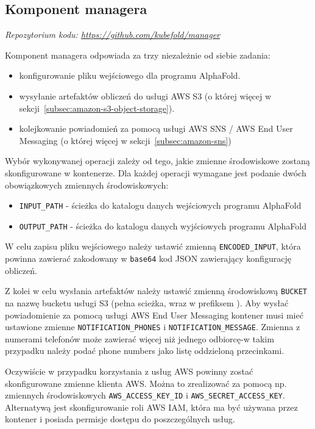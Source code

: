 \subsection{Komponent managera}\label{subsec:component-manager}
\textit{Repozytorium kodu: \url{https://github.com/kubefold/manager}}

Komponent managera odpowiada za trzy niezależnie od siebie zadania:
\begin{itemize}
    \item konfigurowanie pliku wejściowego  dla programu AlphaFold.
    \item wysyłanie artefaktów obliczeń do usługi AWS S3 (o której więcej w sekcji~\ref{subsec:amazon-s3-object-storage}).
    \item kolejkowanie powiadomień za pomocą usługi AWS SNS / AWS End User Messaging (o której więcej w sekcji~\ref{subsec:amazon-sns})
\end{itemize}

Wybór wykonywanej operacji zależy od tego, jakie zmienne środowiskowe zostaną skonfigurowane w kontenerze.
Dla każdej operacji wymagane jest podanie dwóch obowiązkowych zmiennych środowiskowych:
\begin{itemize}
    \item \texttt{INPUT\_PATH} - ścieżka do katalogu danych wejściowych programu AlphaFold
    \item \texttt{OUTPUT\_PATH} - ścieżka do katalogu danych wyjściowych programu AlphaFold
\end{itemize}

W celu zapisu pliku wejściowego  należy ustawić zmienną \texttt{ENCODED\_INPUT}, która powinna zawierać zakodowany w \texttt{base64} kod JSON zawierający konfigurację obliczeń.

Z kolei w celu wysłania artefaktów należy ustawić zmienną środowiskową \texttt{BUCKET} na nazwę bucketu usługi S3 (pełna scieżka, wraz w prefiksem ).
Aby wysłać powiadomienie za pomocą usługi AWS End User Messaging kontener musi mieć ustawione zmienne \texttt{NOTIFICATION\_PHONES} i \texttt{NOTIFICATION\_MESSAGE}.
Zmienna z numerami telefonów może zawierać więcej niż jednego odbiorcę-w takim przypadku należy podać phone numbers jako listę oddzieloną przecinkami.

Oczywiście w przypadku korzystania z usług AWS powinny zostać skonfigurowane zmienne klienta AWS. Można to zrealizować za pomocą np. zmiennych środowiskowych \texttt{AWS\_ACCESS\_KEY\_ID} i \texttt{AWS\_SECRET\_ACCESS\_KEY}.
Alternatywą jest skonfigurowanie roli AWS IAM, która ma być używana przez kontener i posiada permisje dostępu do poszczególnych usług.